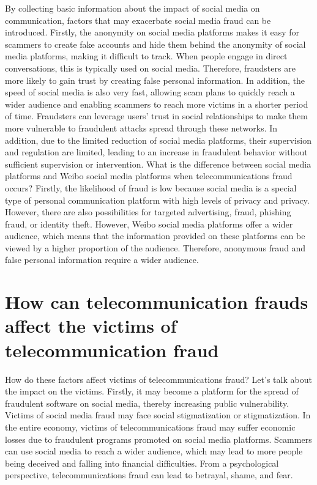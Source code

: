 \documentclass[man,floatsintext]{apa7}
\begin{document}
By collecting basic information about the impact of social media on communication, factors that may exacerbate social media fraud can be introduced. Firstly, the anonymity on social media platforms makes it easy for scammers to create fake accounts and hide them behind the anonymity of social media platforms, making it difficult to track. When people engage in direct conversations, this is typically used on social media.\autocite{kumarFalseInformationWeb2018} Therefore, fraudsters are more likely to gain trust by creating false personal information. In addition, the speed of social media is also very fast, allowing scam plans to quickly reach a wider audience and enabling scammers to reach more victims in a shorter period of time. Fraudsters can leverage users' trust in social relationships to make them more vulnerable to fraudulent attacks spread through these networks. In addition, due to the limited reduction of social media platforms, their supervision and regulation are limited, leading to an increase in fraudulent behavior without sufficient supervision or intervention. What is the difference between social media platforms and Weibo social media platforms when telecommunications fraud occurs? Firstly, the likelihood of fraud is low because social media is a special type of personal communication platform with high levels of privacy and privacy. However, there are also possibilities for targeted advertising, fraud, phishing fraud, or identity theft. However, Weibo social media platforms offer a wider audience, which means that the information provided on these platforms can be viewed by a higher proportion of the audience. Therefore, anonymous fraud and false personal information require a wider audience.

\section{How can telecommunication frauds affect the victims of telecommunication fraud}

How do these factors affect victims of telecommunications fraud? Let's talk about the impact on the victims. Firstly, it may become a platform for the spread of fraudulent software on social media, thereby increasing public vulnerability. Victims of social media fraud may face social stigmatization or stigmatization. In the entire economy, victims of telecommunications fraud may suffer economic losses due to fraudulent programs promoted on social media platforms. Scammers can use social media to reach a wider audience, which may lead to more people being deceived and falling into financial difficulties. From a psychological perspective, telecommunications fraud can lead to betrayal, shame, and fear.
\end{document}
